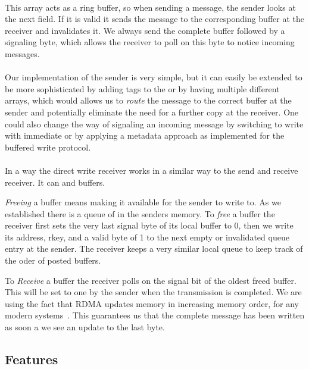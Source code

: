 \paragraph{} This array acts as a ring buffer, so when sending a message, the sender looks at the next field. If it is
valid it sends the message to the corresponding buffer at the receiver and invalidates it. We always send the complete
buffer followed by a signaling byte, which allows the receiver to poll on this byte to notice incoming messages.

\paragraph{} Our implementation of the sender is very simple, but it can easily be extended to be more sophisticated by adding
tags to the  or by having multiple different arrays, which would allows us to \emph{route} the message to the
correct buffer at the sender and potentially eliminate the need for a further copy at the receiver. One could also change
the way of signaling an incoming message by switching to write with immediate or by applying a metadata approach as implemented
for the buffered write protocol.


\paragraph{} In a way the direct write receiver works in a similar way to the send and receive receiver. It can  and 
 buffers. 

\emph{Freeing} a buffer means making it available for the sender to write to. As we established  
there is a queue of  in the senders memory. To \emph{free} a buffer the receiver first sets the very last 
signal byte of its local buffer to 0, then we write its address, rkey, and a valid byte of 1 to the next empty or 
invalidated queue entry at the sender. The receiver keeps a very similar local queue to keep track of the oder of 
posted buffers.

To \emph{Receive} a buffer the receiver polls on the signal bit of the oldest freed buffer. This will be set
to one by the sender when the transmission is completed. We are using the fact that RDMA updates memory in increasing memory 
order, for any modern systems~\cite{herd, farm}. This guarantees us that the complete message has been written as soon a we
see an update to the last byte.

\subsection{Features}

